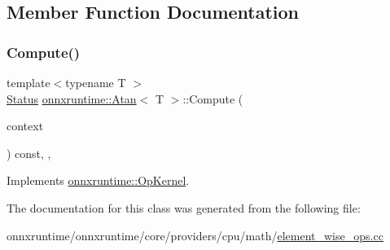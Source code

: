 \subsection{Member Function Documentation}
\mbox{\label{classonnxruntime_1_1Atan_a5df466303e38a353a6d6ee4699ef58e8}} 
\subsubsection{\texorpdfstring{Compute()}{Compute()}}
{\footnotesize\ttfamily template$<$typename T $>$ \\
\mbox{\hyperlink{classonnxruntime_1_1common_1_1Status}{Status}} \mbox{\hyperlink{classonnxruntime_1_1Atan}{onnxruntime\+::\+Atan}}$<$ T $>$\+::Compute (\begin{DoxyParamCaption}\item[{\mbox{\hyperlink{classonnxruntime_1_1OpKernelContext}{Op\+Kernel\+Context}} $\ast$}]{context }\end{DoxyParamCaption}) const\hspace{0.3cm}{\ttfamily [inline]}, {\ttfamily [override]}, {\ttfamily [virtual]}}



Implements \mbox{\hyperlink{classonnxruntime_1_1OpKernel_a9eca8656a78b1b3ab9d3351a12798650}{onnxruntime\+::\+Op\+Kernel}}.



The documentation for this class was generated from the following file\+:\begin{DoxyCompactItemize}
\item 
onnxruntime/onnxruntime/core/providers/cpu/math/\mbox{\hyperlink{element__wise__ops_8cc}{element\+\_\+wise\+\_\+ops.\+cc}}\end{DoxyCompactItemize}
